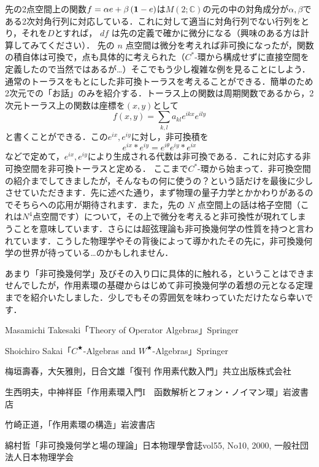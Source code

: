 先の2点空間上の関数$f=\alpha e+\beta \left({\bf 1}-e\right)$は$M\left(2;\mathbb{C}\right)$の元の中の対角成分が$\alpha,\beta$である2次対角行列に対応している．これに対して適当に対角行列でない行列をとり，それを$D$とすれば， $df$ は先の定義で確かに微分になる（興味のある方は計算してみてください）．
先の $n$ 点空間は微分を考えれば非可換になったが，関数の積自体は可換で，点も具体的に考えられた（$C^*$-環から構成せずに直接空間を定義したので当然ではあるが…）そこでもう少し複雑な例を見ることにしよう．通常のトーラスをもとにした非可換トーラスを考えることができる．簡単のため2次元での「お話」のみを紹介する．トーラス上の関数は周期関数であるから，2次元トーラス上の関数は座標を$\left(x,y\right)$として
\[f(x,y)=\sum_{k,l} a_{kl}e^{ikx}e^{ily}\]
と書くことができる．この$e^{ix},e^{iy}$に対し，非可換積を
\[e^{ix}*e^{iy}=e^{i\theta}e^{iy}*e^{ix}\] 
などで定めて，$e^{ix},e^{iy}$により生成される代数は非可換である．これに対応する非可換空間を非可換トーラスと定める．
ここまで$C^*$-環から始まって．非可換空間の紹介までしてきましたが，そんなもの何に使うの？という話だけを最後に少しさせていただきます．先に述べた通り，まず物理の量子力学とかかわりがあるのでそちらへの応用が期待されます．また，先の $N$ 点空間上の話は格子空間（これは$N^4$点空間です）について，その上で微分を考えると非可換性が現れてしまうことを意味しています．さらには超弦理論も非可換幾何学の性質を持つと言われています．こうした物理学やその背後によって導かれたその先に，非可換幾何学の世界が待っている…のかもしれません．

あまり「非可換幾何学」及びその入り口に具体的に触れる，ということはできませんでしたが，作用素環の基礎からはじめて非可換幾何学の着想の元となる定理までを紹介いたしました．少しでもその雰囲気を味わっていただけたなら幸いです．

\begin{thebibliography}{9}
\item Masamichi Takesaki「Theory of Operator Algebras」Springer
\item Shoichiro Sakai「$C^★$-Algebras and $W^★$-Algebras」Springer
\item 梅垣壽春，大矢雅則，日合文雄「復刊 作用素代数入門」共立出版株式会社
\item 生西明夫，中神祥臣「作用素環入門I　函数解析とフォン・ノイマン環」岩波書店
\item 竹崎正道，「作用素環の構造」岩波書店
\item 綿村哲「非可換幾何学と場の理論」日本物理學會誌vol55, No10, 2000, 一般社団法人日本物理学会
\end{thebibliography}
